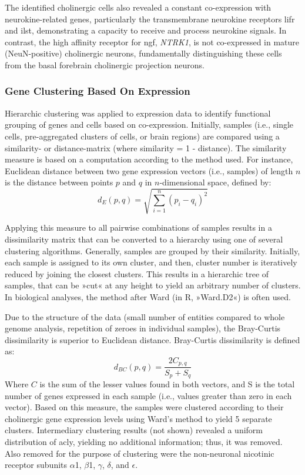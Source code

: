 The identified cholinergic cells also revealed a constant co-expression with neurokine-related genes, particularly the transmembrane neurokine receptors \ac{lifr} and \ac{ilst}, demonstrating a capacity to receive and process neurokine signals. In contrast, the high affinity receptor for \ac{ngf}, \textit{NTRK1}, is not co-expressed in mature (NeuN-positive) cholinergic neurons, fundamentally distinguishing these cells from the basal forebrain cholinergic projection neurons.

\begin{method}

\subsubsection{Gene Clustering Based On Expression}

Hierarchic clustering was applied to expression data to identify functional grouping of genes and cells based on co-expression. Initially, samples (i.e., single cells, pre-aggregated clusters of cells, or brain regions) are compared using a similarity- or distance-matrix (where similarity = \num{1} - distance). The similarity measure is based on a computation according to the method used. For instance, Euclidean distance between two gene expression vectors (i.e., samples) of length $n$ is the distance between points $p$ and $q$ in $n$-dimensional space, defined by: $$d_E(p, q) = \sqrt{\sum_{i=1}^{n} (p_{i}-q_{i})^2}$$

Applying this measure to all pairwise combinations of samples results in a dissimilarity matrix that can be converted to a hierarchy using one of several clustering algorithms. Generally, samples are grouped by their similarity. Initially, each sample is assigned to its own cluster, and then, cluster number is iteratively reduced by joining the closest clusters. This results in a hierarchic tree of samples, that can be »cut« at any height to yield an arbitrary number of clusters. In biological analyses, the method after Ward (in R, »Ward.D2«) is often used\cite{Murtagh2014}.

Due to the structure of the data (small number of entities compared to whole genome analysis, repetition of zeroes in individual samples), the Bray-Curtis dissimilarity\cite{Bray1957} is superior to Euclidean distance. Bray-Curtis dissimilarity is defined as: $$d_{BC}(p, q) = \frac{2C_{p, q}}{S_p+S_q}$$ Where $C$ is the sum of the lesser values found in both vectors, and S is the total number of genes expressed in each sample (i.e., values greater than zero in each vector). Based on this measure, the samples were clustered according to their cholinergic gene expression levels using Ward's method to yield 5 separate clusters. Intermediary clustering results (not shown) revealed a uniform distribution of \ac{acly}, yielding no additional information; thus, it was removed. Also removed for the purpose of clustering were the non-neuronal nicotinic receptor subunits $\alpha$\num{1}, $\beta$\num{1}, $\gamma$, $\delta$, and $\epsilon$. 

\end{method}

